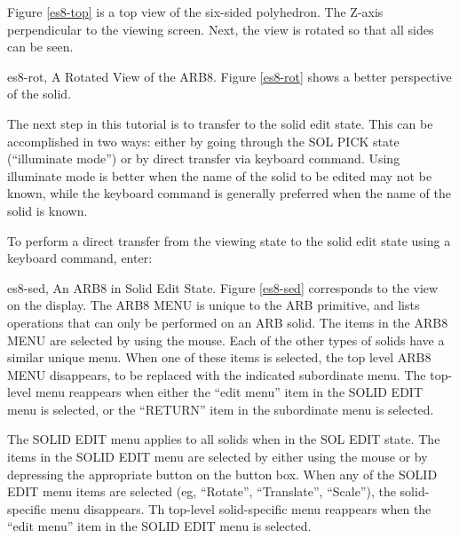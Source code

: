 Figure \ref{es8-top}
is a top view of the six-sided polyhedron.
The Z-axis perpendicular to the viewing screen.
Next, the view is rotated so that all sides can be seen.


\mfig es8-rot, A Rotated View of the ARB8.
Figure \ref{es8-rot} shows a better perspective of the solid.

The next step in this tutorial is to transfer to the solid edit state.
This can be accomplished in two ways:  either by going through
the SOL PICK state (``illuminate mode'') or by direct transfer via
keyboard command.
Using illuminate mode is better when the name of the solid to be
edited may not be known, while the keyboard command is generally
preferred when the name of the solid is known.


To perform a direct transfer from the viewing state to the solid edit state
using a keyboard command, enter:


\mfig es8-sed, An ARB8 in Solid Edit State.
Figure \ref{es8-sed} corresponds to the view on the display.
The ARB8 MENU is unique to the ARB primitive,
and lists operations that can only be performed on an ARB solid.
The items in the ARB8 MENU are
selected by using the mouse.
Each of the other types of solids have a
similar unique menu.
When one of these items is selected, the top level ARB8 MENU disappears,
to be replaced with the indicated subordinate menu.
The top-level menu reappears when either
the ``edit menu'' item in the SOLID EDIT menu is selected,
or the ``RETURN'' item in the subordinate menu is selected.

The  SOLID EDIT  menu applies to all
solids when in the SOL EDIT state.
The items in the  SOLID EDIT  menu are selected
by either using the mouse or by depressing the appropriate button on the
button box.
When any of the SOLID EDIT menu items are selected
(eg, ``Rotate'', ``Translate'', ``Scale''), the solid-specific menu
disappears.
Th top-level solid-specific menu reappears when
the ``edit menu'' item in the SOLID EDIT menu is selected.

